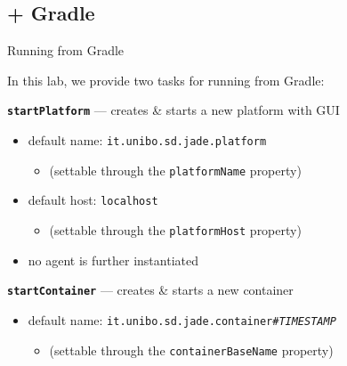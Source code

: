 \documentclass{beamer}\mode<presentation>{\usetheme{AMSCesenaPurpleAndGold}}
\begin{document}

\subsection{\jade{} + Gradle}

\begin{frame}[allowframebreaks]{Running \jade{} from Gradle}

    In this lab, we provide two tasks for running \jade{} from Gradle:

    \bigskip

    \begin{block}{\textbf{\texttt{startPlatform}} --- creates \& starts a new platform with GUI}
        \begin{itemize}
            \item default name: \texttt{it.unibo.sd.jade.platform}
            \begin{itemize}
                \item (settable through the \texttt{platformName} property)
            \end{itemize}

            \item default host: \texttt{localhost}
            \begin{itemize}
                \item (settable through the \texttt{platformHost} property)
            \end{itemize}

            \item \alert{no agent} is further instantiated
        \end{itemize}
    \end{block}

    \begin{block}{\textbf{\texttt{startContainer}} --- creates \& starts a new container}
        \begin{itemize}

            \item default name: \texttt{it.unibo.sd.jade.container\#\textit{TIMESTAMP}}
            \begin{itemize}
                \item (settable through the \texttt{containerBaseName} property)
            \end{itemize}


\end{itemize}
\end{block}
\end{frame}
\end{document}
